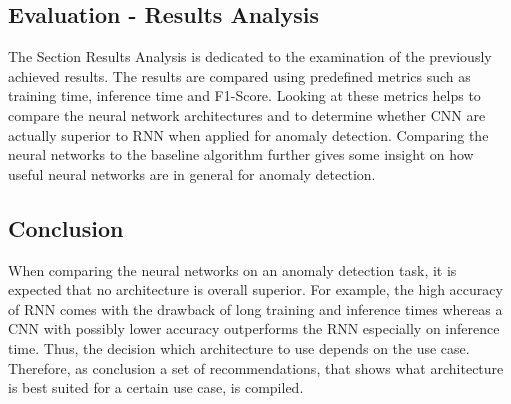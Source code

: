 \subsection{Evaluation - Results Analysis}
The Section Results Analysis is dedicated to the examination of the previously achieved results. The results are compared using predefined metrics such as training time, inference time and F1-Score. Looking at these metrics helps to compare the neural network architectures and to determine whether CNN are actually superior to RNN when applied for anomaly detection. Comparing the neural networks to the baseline algorithm further gives some insight on how useful neural networks are in general for anomaly detection.

\subsection{Conclusion}
When comparing the neural networks on an anomaly detection task, it is expected that no architecture is overall superior. For example, the high accuracy of RNN comes with the drawback of long training and inference times whereas a CNN with possibly lower accuracy outperforms the RNN especially on inference time. Thus, the decision which architecture to use depends on the use case. Therefore, as conclusion a set of recommendations, that shows what architecture is best suited for a certain use case, is compiled.



